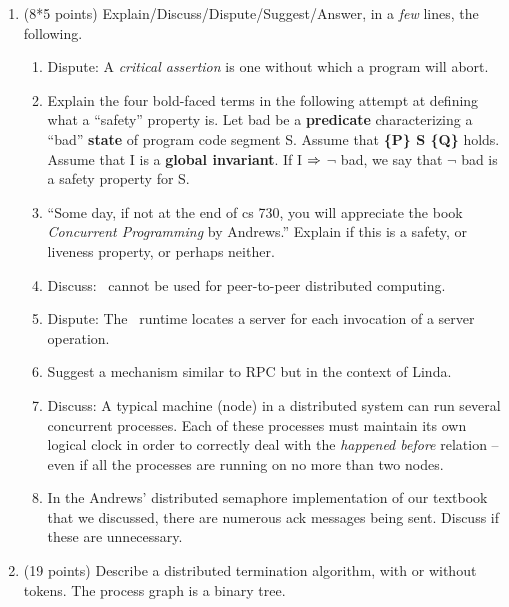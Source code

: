 \begin{enumerate}

\item (8*5 points)
Explain/Discuss/Dispute/Suggest/Answer, in a {\em few} lines, the following.

\begin{enumerate}
\item Dispute:
A {\em critical assertion} is one without which a program will abort.


\item Explain the four bold-faced terms in the following
attempt at defining what a ``safety'' property is.  Let {\sc bad} be a
{\bf predicate} characterizing a  ``bad'' {\bf state} of program code
segment S.  Assume that {\bf \{P\} S \{Q\}} holds.  Assume that I is a
{\bf global invariant}.  If I $\Rightarrow$ $\neg$ {\sc bad}, we say
that $\neg$ {\sc bad} is a safety property for S.

\item
``Some day, if not at the end of {\sc cs} 730, you will appreciate the
book {\em Concurrent Programming} by Andrews.''  Explain if this is a
safety, or liveness property, or perhaps neither.

\item
Discuss:
\RPC\ cannot be used for peer-to-peer distributed computing.

\item
Dispute: The \RPC\ runtime locates a server for each invocation
of a server operation.

\item
Suggest a mechanism similar to RPC but in the context of Linda.


\item
Discuss:
A typical machine (node) in a distributed system can run several
concurrent processes.  Each of these processes must maintain its own
logical clock in order to correctly deal with the {\em happened
before} relation -- even if all the processes are running
on no more than two nodes.

\item
In the Andrews' distributed semaphore implementation of our textbook
that we discussed, there are numerous {\sc ack} messages being sent.
Discuss if these are unnecessary.
\end{enumerate}


\item (19 points)
Describe a distributed termination algorithm, with or without tokens.
The process graph is a binary tree.


\end{enumerate}
